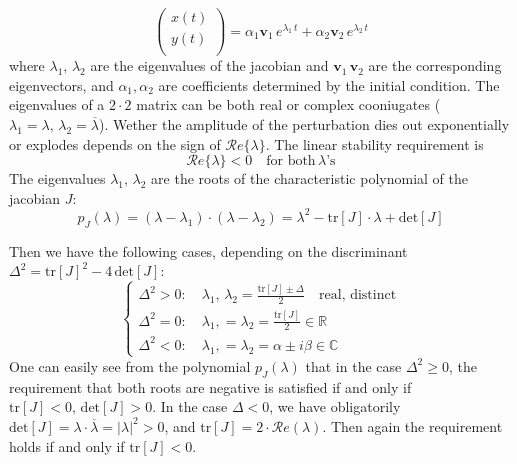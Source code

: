 {\begin{equation*}
\begin{pmatrix}
        x(t) \\
        y(t) \\
    \end{pmatrix}
     = 
     \alpha_1 \mathbf{v}_1\, e^{\lambda_1\, t} + \alpha_2 \mathbf{v}_2\, e^{\lambda_2\, t} 
\end{equation*}
where $\lambda_1,\, \lambda_2$ are the eigenvalues of the jacobian and $\mathbf{v}_1\, \mathbf{v}_2$ are the corresponding eigenvectors, and $\alpha_1, \alpha_2$ are coefficients determined by the initial condition. The eigenvalues of a $2\cdot 2$ matrix can be both real or complex cooniugates ($\lambda_1 = \lambda, \, \lambda_2 = \overline{\lambda}$). Wether the amplitude of the perturbation dies out exponentially or explodes depends on the sign of $\mathcal{R}e\{\lambda\}$. The linear stability requirement is
$$
\mathcal{R}e\{\lambda\} <0 \quad \text{for both} \, \lambda\text{'s}
$$
The eigenvalues $\lambda_1,\, \lambda_2$ are the roots of the characteristic polynomial of the jacobian $J$:
\begin{equation*}
    p_J(\lambda) = (\lambda - \lambda_1)\cdot (\lambda - \lambda_2) = \lambda^2 - \text{tr}[J]\cdot\lambda + \text{det}[J]
\end{equation*}
\begin{minipage}{0.5\textwidth}
Then we have the following cases, depending on the discriminant $\Delta^2 = \text{tr}[J]^2 - 4\,\text{det}[J]$:
\begin{equation*}
    \begin{cases}
        \Delta^2 > 0: \quad \lambda_1,\, \lambda_2  =  \frac{\text{tr}[J] \pm \Delta }{2} \quad \text{real, distinct} \\
        \Delta^2 = 0: \quad \lambda_1,= \lambda_2 = \frac{\text{tr}[J]}{2} \in \mathbb{R} \\
        \Delta^2 <0: \quad \lambda_1,= \lambda_2  = \alpha \pm i \beta \in \mathbb{C}
    \end{cases}
\end{equation*}
One can easily see from the polynomial $p_J(\lambda)$ that in the case $\Delta^2 \geq 0$, the requirement that both roots are negative is satisfied if and only if $\text{tr}[J]<0,\, \text{det}[J] >0$. In the case $\Delta <0$, we have obligatorily $\text{det}[J] = \lambda \cdot \overline{\lambda} = |\lambda|^2 >0$, and $\text{tr}[J]= 2\cdot \mathcal{R}e(\lambda)$. Then again the requirement holds if and only if $\text{tr}[J]< 0$.
\end{minipage}
\hfill
{}
\begin{minipage}{0.4\textwidth}

\end{minipage}}
